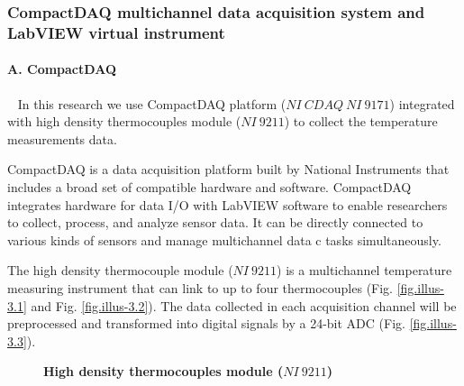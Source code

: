 \documentclass[10pt,a4paper,twocolumn,twoside,UTF8]{article}
\begin{document}
		\subsubsection{CompactDAQ multichannel data acquisition system and LabVIEW virtual instrument}
		\paragraph{A. CompactDAQ}~
		\newline 
		In this research we use CompactDAQ platform ($NI\ CDAQ\ NI\ 9171$) integrated with high density thermocouples module ($NI \ 9211$) to collect the temperature measurements data.

		CompactDAQ is a data acquisition platform built by National Instruments that includes a broad set of compatible hardware and software. 
		CompactDAQ integrates hardware for data I/O with LabVIEW software to enable researchers to collect, process, and analyze sensor data. It can be directly connected to various kinds of sensors and manage multichannel data c tasks simultaneously.

		The high density thermocouple module ($NI \ 9211$) is a multichannel temperature measuring instrument that can link to up to four thermocouples (Fig. \ref{fig.illus-3.1} and Fig. \ref{fig.illus-3.2}). 
		The data collected in each acquisition channel will be preprocessed and transformed into digital signals by a 24-bit ADC (Fig. \ref{fig.illus-3.3}). 

		\begin{figure}[htbp]
			\centering
			\caption{\textbf{High density thermocouples module ($NI \ 9211$)}}
		\end{figure}
\end{document}
